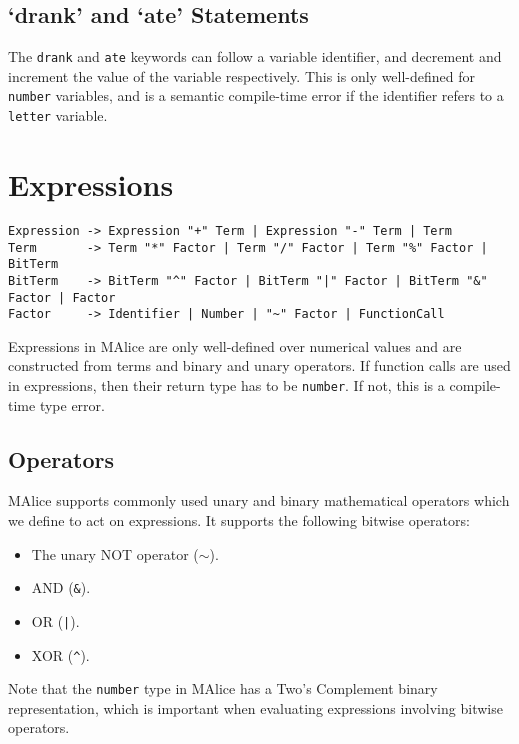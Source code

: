 \documentclass[a4wide, 11pt]{article}
\begin{document}
\subsection{`drank' and `ate' Statements}

The \texttt{drank} and \texttt{ate} keywords can follow a variable identifier, and decrement and increment the value of the variable respectively. This is only well-defined for \texttt{number} variables, and is a semantic compile-time error if the identifier refers to a \texttt{letter} variable.
  
\section{Expressions}

\begin{verbatim}
Expression -> Expression "+" Term | Expression "-" Term | Term
Term       -> Term "*" Factor | Term "/" Factor | Term "%" Factor | BitTerm
BitTerm    -> BitTerm "^" Factor | BitTerm "|" Factor | BitTerm "&" Factor | Factor
Factor     -> Identifier | Number | "~" Factor | FunctionCall
\end{verbatim}

Expressions in MAlice are only well-defined over numerical values and are constructed from terms and binary and unary operators. If function calls are used in expressions, then their return type has to be \texttt{number}. If not, this is a compile-time type error.

\subsection{Operators}

MAlice supports commonly used unary and binary mathematical operators which we define to act on expressions. It supports the following bitwise operators:

\begin{itemize}

\item The unary NOT operator ($\sim$).
\item AND (\texttt{\&}).
\item OR (\texttt{|}).
\item XOR (\texttt{\^}).

\end{itemize}

Note that the \texttt{number} type in MAlice has a Two's Complement binary representation, which is important when evaluating expressions involving bitwise operators.
\end{document}
